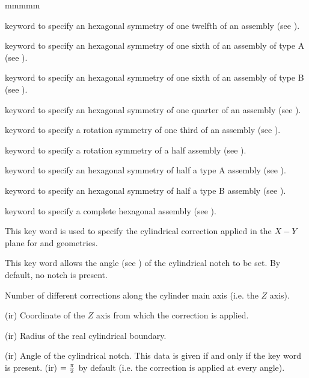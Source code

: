 \begin{ListeDeDescription}{mmmmm}
\item[\moc{S30}] keyword to specify an hexagonal symmetry of one twelfth of an
assembly (see ).

\item[\moc{SA60}] keyword to specify an hexagonal symmetry of one sixth of an
assembly of type A (see ).

\item[\moc{SB60}] keyword to specify an hexagonal symmetry of one sixth of an
assembly of type B (see ).

\item[\moc{S90}] keyword to specify an hexagonal symmetry of one quarter of an
assembly (see ).

\item[\moc{R120}] keyword to specify a rotation symmetry of one third of an
assembly (see ).

\item[\moc{R180}] keyword to specify a rotation symmetry of a half assembly
(see ).

\item[\moc{SA180}] keyword to specify an hexagonal symmetry of half a type A
assembly (see ).

\item[\moc{SB180}] keyword to specify an hexagonal symmetry of half a type B
assembly (see ).

\item[\moc{COMPLETE}] keyword to specify a complete hexagonal assembly (see
).

\item[\moc{RADS}] This key word is used to specify the cylindrical correction applied in the $X-Y$ plane for  and  geometries.\cite{roy}

\item[\moc{ANG}] This key word allows  the angle (see )
of the cylindrical notch to be set. By default, no notch is present.

\item[\dusa{nrads}] Number of different corrections along the cylinder main axis (i.e. the $Z$ axis).

\item[\dusa{xrad}(ir)] Coordinate of the $Z$ axis from which the correction is applied.

\item[\dusa{rrad}(ir)] Radius of the real cylindrical boundary.

\item[\dusa{ang}(ir)] Angle of the cylindrical notch. This data is given if and only if the key word  is present. (ir) $= {\pi \over 2}$ by default (i.e. the correction is applied at every angle).

\end{ListeDeDescription}
\goodbreak

